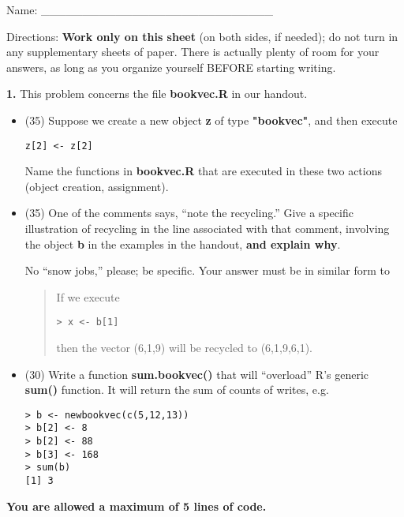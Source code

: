 \documentclass[twocolumn]{article}
\begin{document}
Name: \_\_\_\_\_\_\_\_\_\_\_\_\_\_\_\_\_\_\_\_\_\_\_\_\_\_\_\_

Directions: {\bf Work only on this sheet} (on both sides, if needed); do
not turn in any supplementary sheets of paper. There is actually plenty
of room for your answers, as long as you organize yourself BEFORE
starting writing.

{\bf 1.} This problem concerns the file {\bf bookvec.R} in our handout.

\begin{itemize}

\item [(a)] (35) Suppose we create a new object {\bf z} of type {\bf
"bookvec"}, and then execute

\begin{lstlisting}
z[2] <- z[2]
\end{lstlisting}

Name the functions in {\bf bookvec.R} that are executed in these two
actions (object creation, assignment).

\item [(b)] (35) One of the comments says, ``note the recycling.''  Give a
specific illustration of recycling in the line associated with that
comment, involving the object {\bf b} in the examples in the handout,
{\bf and explain why}.  

No ``snow jobs,'' please; be specific.  Your answer must be in similar
form to

\begin{quote}
If we execute

\begin{lstlisting}
> x <- b[1]
\end{lstlisting}

then the vector (6,1,9) will be recycled to (6,1,9,6,1).
\end{quote}


\item [(c)] (30) Write a function {\bf sum.bookvec()} that will
``overload'' R's generic {\bf sum()} function.  It will return the sum
of counts of writes, e.g.

\begin{lstlisting}
> b <- newbookvec(c(5,12,13))
> b[2] <- 8
> b[2] <- 88
> b[3] <- 168
> sum(b)
[1] 3
\end{lstlisting}

\end{itemize}

{\bf You are allowed a maximum of 5 lines of code.}
\end{document}
